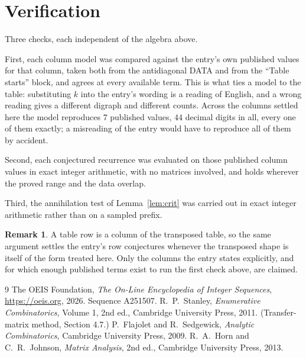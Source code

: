 \documentclass[11pt,a4paper]{article}
\theoremstyle{plain}
\theoremstyle{definition}
\newtheorem{remark}[theorem]{Remark}
\begin{document}
\section{Verification}

Three checks, each independent of the algebra above.

First, each column model was compared against the entry's own published values for that
column, taken both from the antidiagonal DATA and from the ``Table starts'' block, and agrees
at every available term. This is what ties a model to the table: substituting $k$ into the
entry's wording is a reading of English, and a wrong reading gives a different digraph and
different counts. Across the columns settled here the model reproduces $7$ published
values, $44$ decimal digits in all, every one of them exactly; a misreading of the entry
would have to reproduce all of them by accident.

Second, each conjectured recurrence was evaluated on those published column values in exact
integer arithmetic, with no matrices involved, and holds wherever the proved range and the
data overlap.

Third, the annihilation test of Lemma~\ref{lem:crit} was carried out in exact integer
arithmetic rather than on a sampled prefix.

\begin{remark}
A table row is a column of the transposed table, so the same argument settles the entry's row
conjectures whenever the transposed shape is itself of the form treated here. Only the columns
the entry states explicitly, and for which enough published terms exist to run the first check
above, are claimed.
\end{remark}

\begin{thebibliography}{9}
 The OEIS Foundation, \emph{The On-Line Encyclopedia of Integer
Sequences}, \url{https://oeis.org}, 2026. Sequence A251507.
 R.~P.~Stanley, \emph{Enumerative Combinatorics}, Volume 1, 2nd ed.,
Cambridge University Press, 2011. (Transfer-matrix method, Section 4.7.)
 P.~Flajolet and R.~Sedgewick, \emph{Analytic Combinatorics}, Cambridge
University Press, 2009.
 R.~A.~Horn and C.~R.~Johnson, \emph{Matrix Analysis}, 2nd ed., Cambridge
University Press, 2013.
\end{thebibliography}
\end{document}
